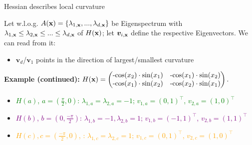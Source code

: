 \begin{vbframe}{Hessian describes local curvature} 

\begin{footnotesize}

Let w.l.o.g. $A(\mathbf{x}) = \{\lambda_{1, \mathbf{x}}, ..., \lambda_{d, \mathbf{x}}\}$ be Eigenspectrum with $\lambda_{1, \mathbf{x}} \le \lambda_{2, \mathbf{x}} \le ... \le \lambda_{d, \mathbf{x}}$ of $H(\mathbf{x})$; let $\bm{v}_{i, \mathbf{x}}$ define the respective Eigenvectors. We can read from it: 

\begin{itemize}
  \item $\bm{v}_d$/$\bm{v}_1$ points in the direction of largest/smallest curvature
\end{itemize}

\vspace*{0.1cm}



\textbf{Example (continued):} $H(\mathbf{x}) = \begin{pmatrix}
\text{-cos}(x_2)\cdot\text{sin}(x_1) & \text{-cos}(x_1)\cdot\text{sin}(x_2) 
\\ \text{-cos}(x_1)\cdot\text{sin}(x_2) & \text{-cos}(x_2)\cdot\text{sin}(x_1) 
\end{pmatrix}.
$

\begin{itemize}
  \item \textcolor{green}{$H(a)$, $a=(\frac{\pi}{2},0)$: $\lambda_{1,a} = \lambda_{2,a} = -1$; $v_{1,a} = (0, 1)^\top$, $v_{2,a} = (1, 0)^\top$}
  \item \textcolor{purple}{$H(b)$, $b=(0,\frac{-\pi}{2})$: $\lambda_{1,b} = -1, \lambda_{2,b} = 1$; $v_{1,b} = (-1, 1)^\top$, $v_{2,b} = (1, 1)^\top$}
  \item \textcolor{orange}{$H(c), c=(\frac{-\pi}{2},0)$, : $\lambda_{1,c} = \lambda_{2,c} = 1$; $v_{1,c} = (0, 1)^\top$, $v_{2,c} = (1, 0)^\top$}
\end{itemize}

\end{footnotesize}

\vspace*{0.1cm}


\end{vbframe}
